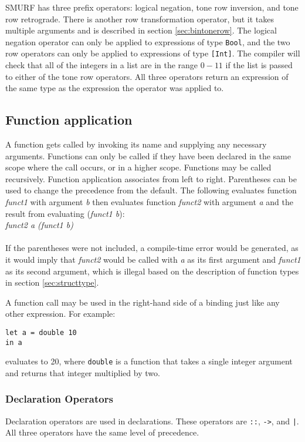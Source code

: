 SMURF has three prefix operators: logical negation, tone row inversion, and tone row retrograde.
There is another row transformation operator, but it takes multiple arguments and is described in
section \ref{sec:bintonerow}. The logical negation operator can only be applied to expressions of
type \texttt{Bool}, and the two row operators can only be applied to expressions of type
\texttt{[Int]}. The compiler will check that all of the integers in a list are in the range $0-11$
if the list is passed to either of the tone row operators.
All three operators return an expression of the same type as the expression the
operator was applied to.


\subsection{Function application}
A function gets called by invoking its name and supplying any necessary arguments. 
Functions can only be called if they have been declared in the same scope where the call occurs,
or in a higher scope. Functions may be called recursively. Function application associates 
from left to right. Parentheses can be used to change the precedence from the default.
The following evaluates function \emph{funct1} with argument \emph{b} then evaluates function
\emph{funct2} with argument \emph{a} and the result from evaluating (\emph{funct1 b}): \\
    
    \emph{funct2 a (funct1 b)}\\ \\
If the parentheses were not included, a compile-time error would be generated, as it would imply
that \emph{funct2} would be called with \emph{a} as
its first argument and \emph{funct1} as its second argument, which is illegal based on the description
of function types in section \ref{sec:structtype}.

A function call may be used in the right-hand side of a binding just like any other expression. 
For example:
\begin{verbatim}
let a = double 10 
in a
\end{verbatim}
evaluates to 20, where \texttt{double} is a function that takes a single integer argument and
returns that integer multiplied by two. 

\subsubsection{Declaration Operators}
Declaration operators are used in declarations. These 
operators are \texttt{::}, \texttt{->}, and \texttt{|}. 
All three operators have the same level of precedence. 

